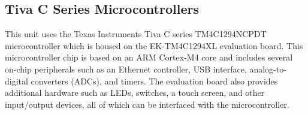 \documentclass{article}
\begin{document}
\subsection{Tiva C Series Microcontrollers}
This unit uses the Texas Instruments Tiva C series TM4C1294NCPDT
microcontroller which is housed on the EK-TM4C1294XL evaluation board.
This microcontroller chip is based on an ARM Cortex-M4 core and
includes several on-chip peripherals such as an Ethernet controller,
USB interface, analog-to-digital converters (ADCs), and timers. The
evaluation board also provides additional hardware such as LEDs,
switches, a touch screen, and other input/output devices, all of which
can be interfaced with the microcontroller.
\end{document}
